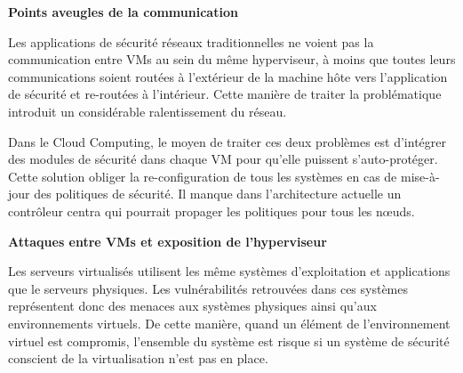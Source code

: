 \textbf{Points aveugles de la communication}

Les applications de sécurité réseaux traditionnelles ne voient pas la communication entre VMs au sein du même hyperviseur, à moins que toutes leurs communications soient routées à l'extérieur de la machine hôte vers l'application de sécurité et re-routées à l'intérieur. Cette manière de traiter la problématique introduit un considérable ralentissement du réseau. 

Dans le Cloud Computing, le moyen de traiter ces deux problèmes est d'intégrer des modules de sécurité dans chaque VM pour qu'elle puissent s'auto-protéger. Cette solution obliger la re-configuration de tous les systèmes en cas de mise-à-jour des politiques de sécurité. Il manque dans l'architecture actuelle un contrôleur centra qui pourrait propager les politiques pour tous les nœuds. 

\textbf{Attaques entre VMs et exposition de l'hyperviseur}

Les serveurs virtualisés utilisent les même systèmes d'exploitation et applications que le serveurs physiques. Les vulnérabilités retrouvées dans ces systèmes représentent donc des menaces aux systèmes physiques ainsi qu'aux environnements virtuels. De cette manière, quand un élément de l'environnement virtuel est compromis, l'ensemble du système est risque si un système de sécurité conscient de la virtualisation n'est pas en place. 

